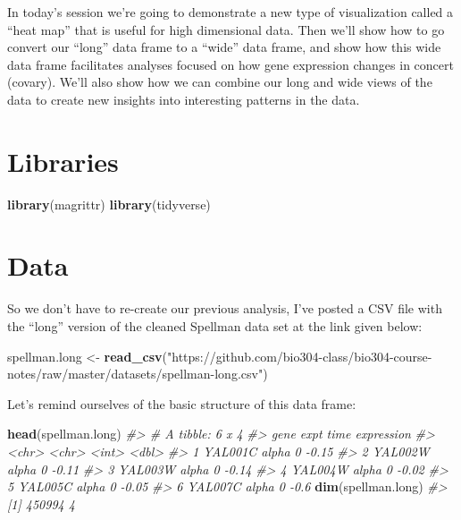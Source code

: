 \documentclass[]{book}
\newenvironment{Shaded}{\begin{snugshade}}{\end{snugshade}}
\newcommand{\CommentTok}[1]{\textcolor[rgb]{0.56,0.35,0.01}{\textit{#1}}}
\newcommand{\KeywordTok}[1]{\textcolor[rgb]{0.13,0.29,0.53}{\textbf{#1}}}
\newcommand{\NormalTok}[1]{#1}
\newcommand{\StringTok}[1]{\textcolor[rgb]{0.31,0.60,0.02}{#1}}
\theoremstyle{definition}
\theoremstyle{definition}
\theoremstyle{definition}
\theoremstyle{remark}
\begin{document}
In today's session we're going to demonstrate a new type of
visualization called a ``heat map'' that is useful for high dimensional
data. Then we'll show how to go convert our ``long'' data frame to a
``wide'' data frame, and show how this wide data frame facilitates
analyses focused on how gene expression changes in concert (covary).
We'll also show how we can combine our long and wide views of the data
to create new insights into interesting patterns in the data.

\hypertarget{libraries-3}{%
\section{Libraries}\label{libraries-3}}

\begin{Shaded}
\begin{Highlighting}[]
\KeywordTok{library}\NormalTok{(magrittr)}
\KeywordTok{library}\NormalTok{(tidyverse)}
\end{Highlighting}
\end{Shaded}

\hypertarget{data-1}{%
\section{Data}\label{data-1}}

So we don't have to re-create our previous analysis, I've posted a CSV
file with the ``long'' version of the cleaned Spellman data set at the
link given below:

\begin{Shaded}
\begin{Highlighting}[]
\NormalTok{spellman.long <-}\StringTok{ }\KeywordTok{read_csv}\NormalTok{(}\StringTok{"https://github.com/bio304-class/bio304-course-notes/raw/master/datasets/spellman-long.csv"}\NormalTok{)}
\end{Highlighting}
\end{Shaded}

Let's remind ourselves of the basic structure of this data frame:

\begin{Shaded}
\begin{Highlighting}[]
\KeywordTok{head}\NormalTok{(spellman.long)}
\CommentTok{#> # A tibble: 6 x 4}
\CommentTok{#>   gene    expt   time expression}
\CommentTok{#>   <chr>   <chr> <int>      <dbl>}
\CommentTok{#> 1 YAL001C alpha     0      -0.15}
\CommentTok{#> 2 YAL002W alpha     0      -0.11}
\CommentTok{#> 3 YAL003W alpha     0      -0.14}
\CommentTok{#> 4 YAL004W alpha     0      -0.02}
\CommentTok{#> 5 YAL005C alpha     0      -0.05}
\CommentTok{#> 6 YAL007C alpha     0      -0.6}
\KeywordTok{dim}\NormalTok{(spellman.long)}
\CommentTok{#> [1] 450994      4}
\end{Highlighting}
\end{Shaded}
\end{document}
